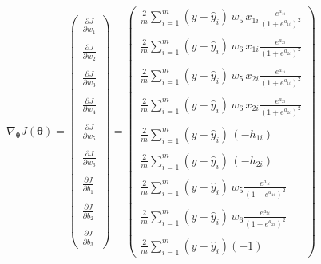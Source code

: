 \documentclass[
  a4paperpaper,
]{article}
\begin{document}
\begin{align}
  \nabla_{\boldsymbol{\theta}}J(\boldsymbol{\theta}) = \begin{pmatrix}
\frac{\partial J}{\partial w_1} \\ \\
\frac{\partial J}{\partial w_2} \\ \\
\frac{\partial J}{\partial w_3} \\ \\
\frac{\partial J}{\partial w_4} \\ \\
\frac{\partial J}{\partial w_5} \\ \\
\frac{\partial J}{\partial w_6} \\ \\
\frac{\partial J}{\partial b_1} \\ \\
\frac{\partial J}{\partial b_2} \\ \\
\frac{\partial J}{\partial b_3} \end{pmatrix} = \begin{pmatrix} 
\frac{2}{m} \sum\limits^m_{i = 1}(y - \hat{y}_i) \, w_5 \, x_{1i} \frac{e^{a_{1i}}}{(1+e^{a_{1i}})^2} \\ \\ 
\frac{2}{m} \sum\limits^m_{i = 1}(y - \hat{y}_i) \, w_6 \, x_{1i} \frac{e^{a_{2i}}}{(1+e^{a_{2i}})^2} \\ \\ 
\frac{2}{m} \sum\limits^m_{i = 1}(y - \hat{y}_i) \, w_5 \, x_{2i} \frac{e^{a_{1i}}}{(1+e^{a_{1i}})^2} \\ \\ 
\frac{2}{m} \sum\limits^m_{i = 1}(y - \hat{y}_i) \, w_6 \, x_{2i} \frac{e^{a_{2i}}}{(1+e^{a_{2i}})^2} \\ \\ 
\frac{2}{m} \sum\limits^m_{i = 1}(y - \hat{y}_i) \, (-h_{1i}) \\ \\ 
\frac{2}{m} \sum\limits^m_{i = 1}(y - \hat{y}_i) \, (-h_{2i}) \\ \\ 
\frac{2}{m} \sum\limits^m_{i = 1}(y - \hat{y}_i) \, w_5 \frac{e^{a_{1i}}}{(1+e^{a_{1i}})^2} \\ \\ 
\frac{2}{m} \sum\limits^m_{i = 1}(y - \hat{y}_i) \, w_6 \frac{e^{a_{2i}}}{(1+e^{a_{2i}})^2} \\ \\ 
\frac{2}{m} \sum\limits^m_{i = 1}(y - \hat{y}_i)(-1)
\end{pmatrix}
\end{align}  
\end{document}
